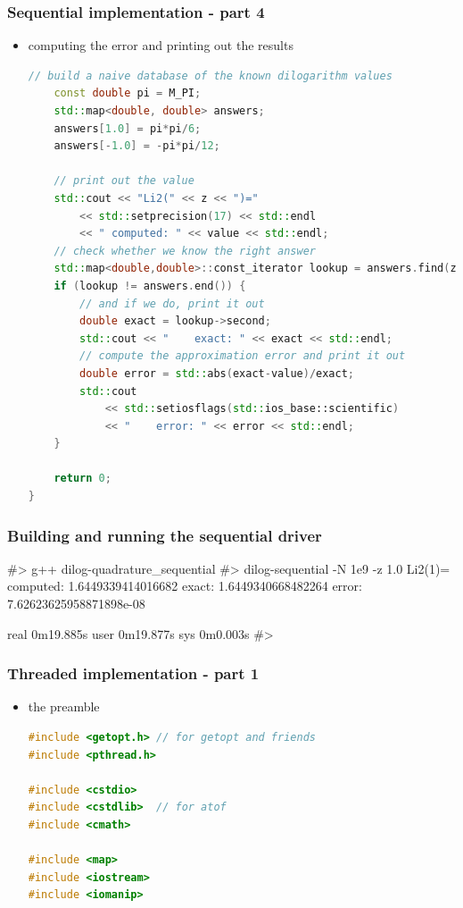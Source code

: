 \begin{frame}[fragile]
%
  \frametitle{Sequential implementation - part 4}
%
  \begin{itemize}
  \item computing the error and printing out the results
  \begin{lstlisting}[language=c++,name=sequential]
    // build a naive database of the known dilogarithm values
    const double pi = M_PI;
    std::map<double, double> answers;
    answers[1.0] = pi*pi/6;
    answers[-1.0] = -pi*pi/12;

    // print out the value
    std::cout << "Li2(" << z << ")="
        << std::setprecision(17) << std::endl
        << " computed: " << value << std::endl;
    // check whether we know the right answer
    std::map<double,double>::const_iterator lookup = answers.find(z);
    if (lookup != answers.end()) {
        // and if we do, print it out
        double exact = lookup->second;
        std::cout << "    exact: " << exact << std::endl;
        // compute the approximation error and print it out
        double error = std::abs(exact-value)/exact;
        std::cout 
            << std::setiosflags(std::ios_base::scientific) 
            << "    error: " << error << std::endl;
    }

    return 0;
}
  \end{lstlisting}
%
  \end{itemize}
%
\end{frame}

\begin{frame}[fragile]
%
  \frametitle{Building and running the sequential driver}
%
  \begin{shell}{}
#> g++ dilog-quadrature_sequential
#> dilog-sequential -N 1e9 -z 1.0
Li2(1)=
 computed: 1.6449339414016682
    exact: 1.6449340668482264
    error: 7.62623625958871898e-08

real    0m19.885s
user    0m19.877s
sys     0m0.003s
#>
  \end{shell}
%
\end{frame}

\begin{frame}[fragile]
%
  \frametitle{Threaded implementation - part 1}
%
  \begin{itemize}
  \item the preamble
  \begin{lstlisting}[language=c++,name=threaded]
#include <getopt.h> // for getopt and friends
#include <pthread.h>

#include <cstdio>
#include <cstdlib>  // for atof
#include <cmath>

#include <map>
#include <iostream>
#include <iomanip>

  \end{lstlisting}
%
  \end{itemize}
%
\end{frame}

